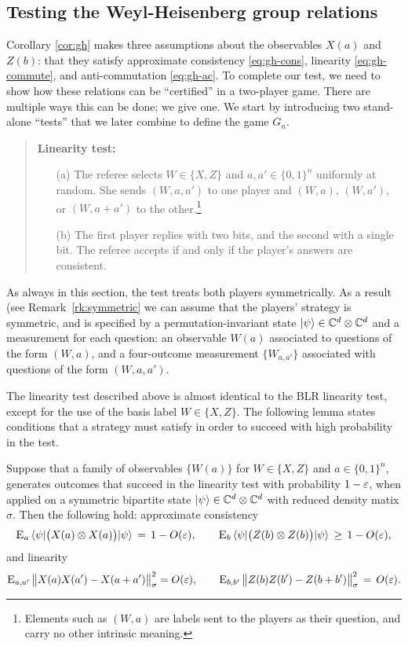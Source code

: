 \subsection{Testing the Weyl-Heisenberg group relations}
\label{sec:wh-test}



Corollary \ref{cor:gh} makes three assumptions about the observables $X(a)$ and $Z(b)$: that they satisfy approximate consistency \eqref{eq:gh-cons}, linearity \eqref{eq:gh-commute}, and anti-commutation \eqref{eq:gh-ac}. To complete our test, we need to show how these relations can be ``certified'' in a two-player game. There are multiple ways this can be done; we give one. We start by introducing two stand-alone ``tests'' that we later combine to define the game $G_n$. 

\begin{quote}
\textbf{Linearity test:}
\begin{itemize}
\item[(a)] The referee selects $W\in\{X,Z\}$ and $a,a'\in\{0,1\}^n$ uniformly at random. She sends $(W,a,a')$ to one player and $(W,a)$, $(W,a')$, or $(W,a+a')$ to the other.\footnote{Elements such as $(W,a)$ are labels sent to the players as their question, and carry no other intrinsic meaning.} 
\item[(b)] The first player replies with two bits, and the second with a single bit. The referee accepts if and only if the player's answers are consistent. 
\end{itemize}
\end{quote}

As always in this section, the test treats both players symmetrically. As a result (see Remark~\ref{rk:symmetric} we can assume that the players' strategy is symmetric, and is specified by a permutation-invariant state $|\psi\rangle\in \mathbb{C}^d \otimes \mathbb{C}^d$ and a measurement for each question: an observable $W(a)$ associated to questions of the form $(W,a)$, and a four-outcome measurement $\{W_{a,a'}\}$ associated with questions of the form $(W,a,a')$. 

The linearity test described above is almost identical to the BLR linearity test, except for the use of the basis label $W\in\{X,Z\}$. The following lemma states conditions that a strategy must satisfy in order to succeed with high probability in the test. 
 
\begin{lemma}\label{lem:com}
Suppose that a family of observables $\{W(a)\}$ for $W\in\{X,Z\}$ and $a\in\{0,1\}^n$, generates outcomes that succeed in the linearity test with probability $1-\varepsilon$, when applied on a symmetric bipartite state $|\psi\rangle\in\mathbb{C}^d\otimes \mathbb{C}^d$ with reduced density matix $\sigma$. Then the following hold: approximate consistency
$$ \textsc{E}_{a} \, \langle\psi|\big(X(a) \otimes X(a)\big) |\psi\rangle \,=\,1-O(\varepsilon),\qquad \textsc{E}_{b} \, \langle\psi|\big(Z(b) \otimes Z(b) \big)|\psi\rangle\,\geq\,1-O(\varepsilon),$$ 
and linearity 
$$
 \textsc{E}_{a,a'} \,\big\|X(a)X(a')-X(a+a')\big\|_\sigma^2 = O(\varepsilon),\qquad\textsc{E}_{b,b'}\, \big\|Z(b)Z(b')-Z(b+b')\big\|_\sigma^2  \,=\, O({\varepsilon}).$$
\end{lemma}

